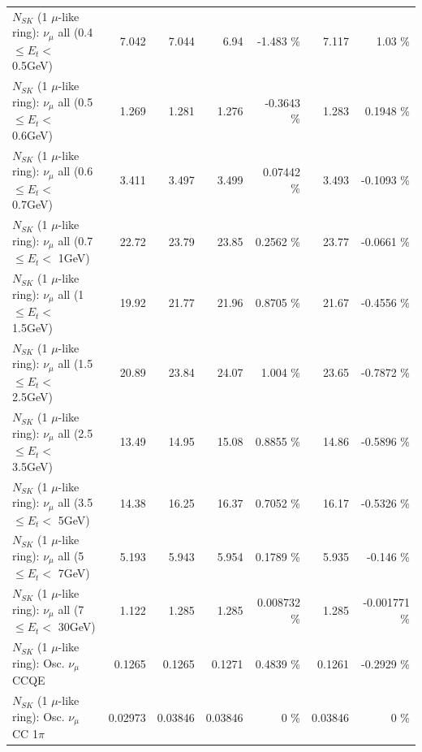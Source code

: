 \begin{table}
\begin{tabular}{| l | r | r | r  r | r  r |}
       $N_{SK}$ (1 $\mu$-like ring): $\nu_{\mu}$ all (0.4 $\leq E_{t} <$ 0.5GeV) &           7.042 &           7.044 &            6.94 &   -1.483 \%  &           7.117 &     1.03 \%  \\ 
       $N_{SK}$ (1 $\mu$-like ring): $\nu_{\mu}$ all (0.5 $\leq E_{t} <$ 0.6GeV) &           1.269 &           1.281 &           1.276 &  -0.3643 \%  &           1.283 &   0.1948 \%  \\ 
       $N_{SK}$ (1 $\mu$-like ring): $\nu_{\mu}$ all (0.6 $\leq E_{t} <$ 0.7GeV) &           3.411 &           3.497 &           3.499 &  0.07442 \%  &           3.493 &  -0.1093 \%  \\ 
         $N_{SK}$ (1 $\mu$-like ring): $\nu_{\mu}$ all (0.7 $\leq E_{t} <$ 1GeV) &           22.72 &           23.79 &           23.85 &   0.2562 \%  &           23.77 &  -0.0661 \%  \\ 
         $N_{SK}$ (1 $\mu$-like ring): $\nu_{\mu}$ all (1 $\leq E_{t} <$ 1.5GeV) &           19.92 &           21.77 &           21.96 &   0.8705 \%  &           21.67 &  -0.4556 \%  \\ 
       $N_{SK}$ (1 $\mu$-like ring): $\nu_{\mu}$ all (1.5 $\leq E_{t} <$ 2.5GeV) &           20.89 &           23.84 &           24.07 &    1.004 \%  &           23.65 &  -0.7872 \%  \\ 
       $N_{SK}$ (1 $\mu$-like ring): $\nu_{\mu}$ all (2.5 $\leq E_{t} <$ 3.5GeV) &           13.49 &           14.95 &           15.08 &   0.8855 \%  &           14.86 &  -0.5896 \%  \\ 
         $N_{SK}$ (1 $\mu$-like ring): $\nu_{\mu}$ all (3.5 $\leq E_{t} <$ 5GeV) &           14.38 &           16.25 &           16.37 &   0.7052 \%  &           16.17 &  -0.5326 \%  \\ 
           $N_{SK}$ (1 $\mu$-like ring): $\nu_{\mu}$ all (5 $\leq E_{t} <$ 7GeV) &           5.193 &           5.943 &           5.954 &   0.1789 \%  &           5.935 &   -0.146 \%  \\ 
          $N_{SK}$ (1 $\mu$-like ring): $\nu_{\mu}$ all (7 $\leq E_{t} <$ 30GeV) &           1.122 &           1.285 &           1.285 & 0.008732 \%  &           1.285 & -0.001771 \%  \\ 
\hline
\hline
                               $N_{SK}$ (1 $\mu$-like ring): Osc. $\nu_\mu$ CCQE &          0.1265 &          0.1265 &          0.1271 &   0.4839 \%  &          0.1261 &  -0.2929 \%  \\ 
                          $N_{SK}$ (1 $\mu$-like ring): Osc. $\nu_\mu$ CC 1$\pi$ &         0.02973 &         0.03846 &         0.03846 &        0 \%  &         0.03846 &        0 \%  \\ 

\end{tabular}
\end{table}

